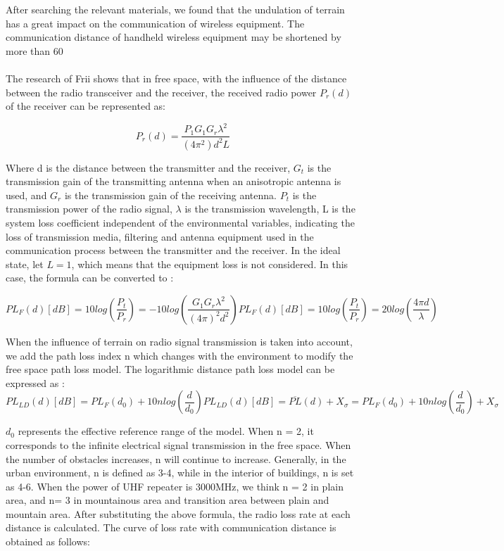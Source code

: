 \documentclass{mcmthesis}
\newcommand{\upcite}[1]{\textsuperscript{\textsuperscript{\cite{#1}}}}
\begin{document}
After searching the relevant materials, we found that the undulation of terrain has a great impact on the communication of wireless equipment. The communication distance of handheld wireless equipment may be shortened by more than 60%

The research of Frii\upcite{c_trans} shows that in free space, with the influence of the distance between the radio transceiver and the receiver, the received radio power $P_r (d)$ of the receiver can be represented as: 

\begin{equation}
P_r(d)=\frac{P_1G_1G_r\lambda ^2}{(4\pi ^2)d^2L}
\end{equation}

Where d is the distance between the transmitter and the receiver, $G_t$ is the transmission gain of the transmitting antenna when an anisotropic antenna is used, and $G_r$ is the transmission gain of the receiving antenna. $P_t$ is the transmission power of the radio signal, $\lambda$  is the transmission wavelength, L is the system loss coefficient independent of the environmental variables, indicating the loss of transmission media, filtering and antenna equipment used in the communication process between the transmitter and the receiver. In the ideal state, let $L = 1$, which means that the equipment loss is not considered. In this case, the formula can be converted to :

\begin{equation}
PL_F(d)[dB]=10log(\frac{P_t}{P_r} )=-10log(\frac{G_1G_r\lambda ^2}{(4\pi)^2d^2} )
PL_F(d)[dB]=10log(\frac{P_t}{P_r} )=20log(\frac{4\pi d}{\lambda})
\end{equation}

When the influence of terrain on radio signal transmission is taken into account, we add the path loss index n which changes with the environment to modify the free space path loss model. The logarithmic distance path loss model can be expressed as :
\begin{equation}
PL_{LD}(d)[dB]=PL_F(d_0)+10nlog(\frac{d}{d_0} )
PL_{LD}(d)[dB]=\overline{PL}(d)+X_\sigma=PL_F(d_0)+10nlog(\frac{d}{d_0} )+X_\sigma 
\end{equation}

$d_0$ represents the effective reference range of the model. When n = 2, it corresponds to the infinite electrical signal transmission in the free space. When the number of obstacles increases, n will continue to increase. Generally, in the urban environment, n is defined as 3-4, while in the interior of buildings, n is set as 4-6. When the power of UHF repeater is 3000MHz, we think n = 2 in plain area, and n= 3 in mountainous area and transition area between plain and mountain area. After substituting the above formula, the radio loss rate at each distance is calculated. The curve of loss rate with communication distance is obtained as follows:
\end{document}
